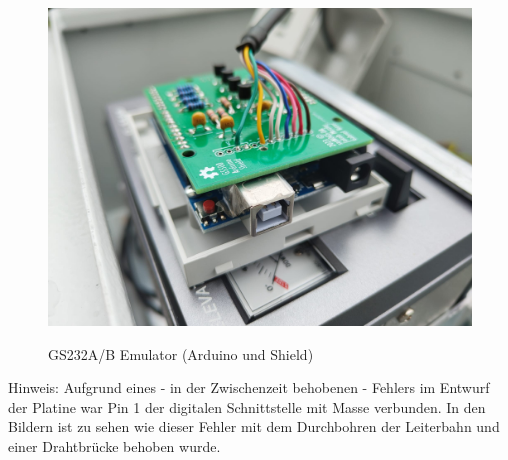 \begin{figure}[H]
	\centering
	\includegraphics[width=15cm]{../ref/PCB_Seite_GS232.jpeg}
	\label{fig:Schaltung_Ausgangstreiber_Arduino-Shield}
	\caption{GS232A/B Emulator (Arduino und Shield)}
\end{figure}

Hinweis: Aufgrund eines - in der Zwischenzeit behobenen - Fehlers im Entwurf der Platine war Pin 1 der digitalen Schnittstelle mit Masse verbunden. In den Bildern ist zu sehen wie dieser Fehler mit dem Durchbohren der Leiterbahn und einer Drahtbrücke behoben wurde.